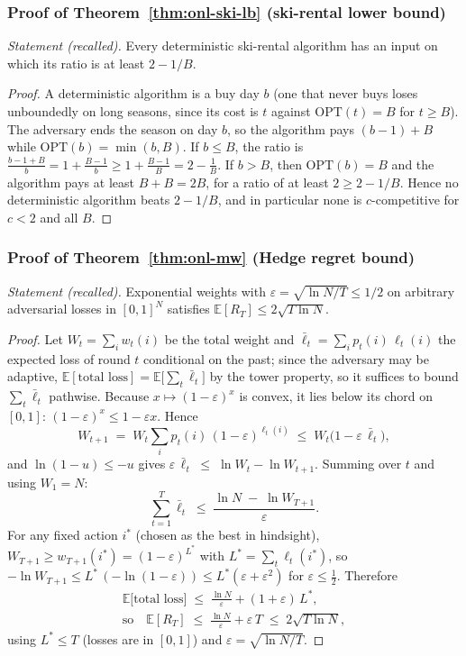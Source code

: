 \subsubsection*{Proof of Theorem~\ref{thm:onl-ski-lb} (ski-rental lower bound)}
{\itshape Statement (recalled).} Every deterministic ski-rental algorithm has
an input on which its ratio is at least $2 - 1/B$.\eop

\begin{proof}
A deterministic algorithm is a buy day $b$ (one that never buys loses
unboundedly on long seasons, since its cost is $t$ against
$\mathrm{OPT}(t) = B$ for $t \ge B$). The adversary ends the season on day
$b$, so the algorithm pays $(b-1) + B$ while $\mathrm{OPT}(b) = \min(b,B)$. If
$b \le B$, the ratio is $\frac{b-1+B}{b} = 1 + \frac{B-1}{b} \ge
1 + \frac{B-1}{B} = 2 - \frac{1}{B}$. If $b > B$, then
$\mathrm{OPT}(b) = B$ and the algorithm pays at least $B + B = 2B$, for a
ratio of at least $2 \ge 2 - 1/B$. Hence no deterministic algorithm beats
$2 - 1/B$, and in particular none is $c$-competitive for $c < 2$ and all $B$.
\end{proof}

\subsubsection*{Proof of Theorem~\ref{thm:onl-mw} (Hedge regret bound)}
{\itshape Statement (recalled).} Exponential weights with
$\varepsilon = \sqrt{\ln N / T} \le 1/2$ on arbitrary adversarial losses in
$[0,1]^N$ satisfies $\mathbb{E}[R_T] \le 2\sqrt{T\ln N}$.\eop

\begin{proof}
Let $W_t = \sum_i w_t(i)$ be the total weight and
$\bar\ell_t = \sum_i p_t(i)\,\ell_t(i)$ the expected loss of round $t$
conditional on the past; since the adversary may be adaptive,
$\mathbb{E}[\text{total loss}] = \mathbb{E}\bigl[\sum_t \bar\ell_t\bigr]$ by
the tower property, so it suffices to bound $\sum_t \bar\ell_t$ pathwise.
Because $x \mapsto (1-\varepsilon)^x$ is convex, it lies below its chord on
$[0,1]$: $(1-\varepsilon)^x \le 1 - \varepsilon x$. Hence
\[
W_{t+1} \;=\; W_t \sum_i p_t(i)\,(1-\varepsilon)^{\ell_t(i)}
\;\le\; W_t\bigl(1 - \varepsilon\,\bar\ell_t\bigr),
\]
and $\ln(1-u) \le -u$ gives
$\varepsilon\,\bar\ell_t \;\le\; \ln W_t - \ln W_{t+1}$. Summing over $t$ and
using $W_1 = N$:
\[
\sum_{t=1}^{T}\bar\ell_t \;\le\; \frac{\ln N \;-\; \ln W_{T+1}}{\varepsilon}.
\]
For any fixed action $i^\ast$ (chosen as the best in hindsight),
$W_{T+1} \ge w_{T+1}(i^\ast) = (1-\varepsilon)^{L^\ast}$ with
$L^\ast = \sum_t \ell_t(i^\ast)$, so
$-\ln W_{T+1} \le L^\ast\,(-\ln(1-\varepsilon)) \le L^\ast(\varepsilon +
\varepsilon^2)$ for $\varepsilon \le \tfrac12$. Therefore
\begin{gather*}
\mathbb{E}\bigl[\text{total loss}\bigr] \;\le\;
\frac{\ln N}{\varepsilon} + (1+\varepsilon)\,L^\ast,\\[2pt]
\text{so}\quad
\mathbb{E}[R_T] \;\le\; \frac{\ln N}{\varepsilon} + \varepsilon\,T
\;\le\; 2\sqrt{T\ln N},
\end{gather*}
using $L^\ast \le T$ (losses are in $[0,1]$) and
$\varepsilon = \sqrt{\ln N / T}$.
\end{proof}

